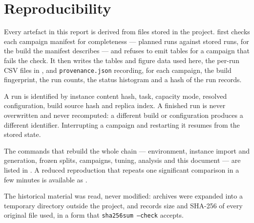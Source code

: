 \section{Reproducibility}
\label{sec:reproducibility}

Every artefact in this report is derived from files stored in the project.
 first checks each campaign manifest for
completeness --- planned runs against stored runs, for the build the manifest
describes --- and refuses to emit tables for a campaign that fails the check. It
then writes the tables and figure data used here, the per-run CSV files in
, and \texttt{provenance.json} recording, for each
campaign, the build fingerprint, the run counts, the status histogram and a hash
of the run records.

A run is identified by instance content hash, task, capacity mode, resolved
configuration, build source hash and replica index. A finished run is never
overwritten and never recomputed: a different build or configuration produces a
different identifier. Interrupting a campaign and restarting it resumes from the
stored state.

The commands that rebuild the whole chain --- environment, instance import and
generation, frozen splits, campaigns, tuning, analysis and this document --- are
listed in . A reduced reproduction that repeats
one significant comparison in a few minutes is available as
.

The historical material was read, never modified: archives were expanded into a
temporary directory outside the project, and
 records size and SHA-256 of every
original file used, in a form that \texttt{sha256sum --check} accepts.
